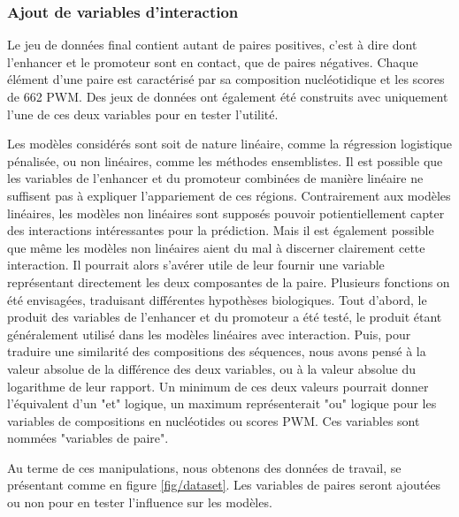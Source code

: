 \documentclass[french]{llncs}
\begin{document}
\subsubsection{Ajout de variables d'interaction}

Le jeu de données final contient autant de paires positives, c'est à dire dont l'enhancer et le promoteur sont en contact, que de paires négatives. Chaque élément d'une paire est caractérisé par sa composition nucléotidique et les scores de 662 PWM. Des jeux de données ont également été construits avec uniquement l'une de ces deux variables pour en tester l'utilité.

Les modèles considérés sont soit de nature linéaire, comme la régression logistique pénalisée, ou non linéaires, comme les méthodes ensemblistes. Il est possible que les variables de l'enhancer et du promoteur combinées de manière linéaire ne suffisent pas à expliquer l'appariement de ces régions. Contrairement aux modèles linéaires, les modèles non linéaires sont supposés pouvoir potientiellement capter des interactions intéressantes pour la prédiction. Mais il est également possible que même les modèles non linéaires aient du mal à discerner clairement cette interaction. Il pourrait alors s'avérer utile de leur fournir une variable représentant directement les deux composantes de la paire. Plusieurs fonctions on été envisagées, traduisant différentes hypothèses biologiques. Tout d'abord, le produit des variables de l'enhancer et du promoteur a été testé, le produit étant généralement utilisé dans les modèles linéaires avec interaction. Puis, pour traduire une similarité des compositions des séquences, nous avons pensé à la valeur absolue de la différence des deux variables, ou à la valeur absolue du logarithme de leur rapport. Un minimum de ces deux valeurs pourrait donner l'équivalent d'un "et" logique, un maximum représenterait "ou" logique pour les variables de compositions en nucléotides ou scores PWM. Ces variables sont nommées "variables de paire".

Au terme de ces manipulations, nous obtenons des données de travail, se présentant comme en figure \ref{fig/dataset}. Les variables de paires seront ajoutées ou non pour en tester l'influence sur les modèles.
\end{document}
